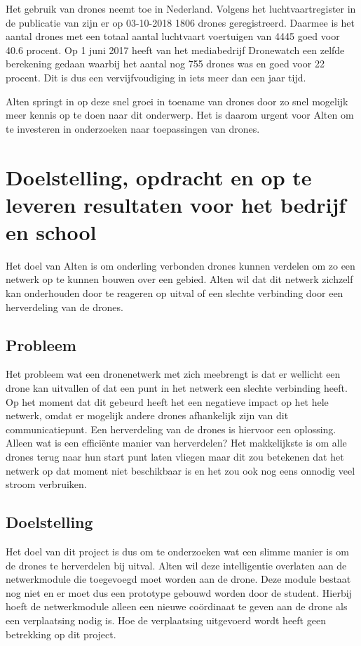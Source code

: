 \documentclass[a4paper, 11pt, oneside]{report}
\begin{document}
Het gebruik van drones neemt toe in Nederland.
Volgens het luchtvaartregister in de publicatie van  zijn er op 03-10-2018 1806 drones geregistreerd. 
Daarmee is het aantal drones met een totaal aantal luchtvaart voertuigen van 4445 goed voor 40.6 procent.
Op 1 juni 2017 heeft  van het mediabedrijf Dronewatch een zelfde berekening gedaan waarbij het aantal nog 755 drones was en goed voor 22 procent. Dit is dus een vervijfvoudiging in iets meer dan een jaar tijd.

Alten springt in op deze snel groei in toename van drones door zo snel mogelijk meer kennis op te doen naar dit onderwerp.
Het is daarom urgent voor Alten om te investeren in onderzoeken naar toepassingen van drones.

\chapter{Doelstelling, opdracht en op te leveren resultaten voor het bedrijf en school}
\label{chapter:doelstelling}
Het doel van Alten is om onderling verbonden drones kunnen verdelen om zo een netwerk op te kunnen bouwen over een gebied. 
Alten wil dat dit netwerk zichzelf kan onderhouden door te reageren op uitval of een slechte verbinding door een herverdeling van de drones.

\section{Probleem}
Het probleem wat een dronenetwerk met zich meebrengt is dat er wellicht een drone kan uitvallen of dat een punt in het netwerk een slechte verbinding heeft. 
Op het moment dat dit gebeurd heeft het een negatieve impact op het hele netwerk, omdat er mogelijk andere drones afhankelijk zijn van dit communicatiepunt.
Een herverdeling van de drones is hiervoor een oplossing. Alleen wat is een efficiënte manier van herverdelen?
Het makkelijkste is om alle drones terug naar hun start punt laten vliegen maar dit zou betekenen dat het netwerk op dat moment niet beschikbaar is en het zou ook nog eens onnodig veel stroom verbruiken. 

\section{Doelstelling}
Het doel van dit project is dus om te onderzoeken wat een slimme manier is om de drones te herverdelen bij uitval. Alten wil deze intelligentie overlaten aan de netwerkmodule die toegevoegd moet worden aan de drone. Deze module bestaat nog niet en er moet dus een prototype gebouwd worden door de student. Hierbij hoeft de netwerkmodule alleen een nieuwe coördinaat te geven aan de drone als een verplaatsing nodig is. Hoe de verplaatsing uitgevoerd wordt heeft geen betrekking op dit project. 
\end{document}
